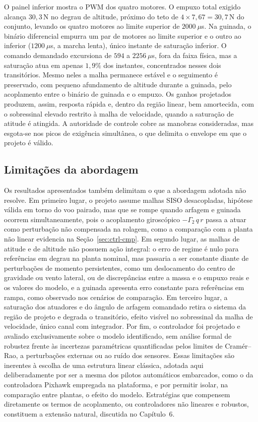 O painel inferior mostra o PWM dos quatro motores. O empuxo total exigido alcança {\color{blue}$30{,}3$\,N} no degrau de altitude, próximo do teto de {\color{blue}$4\times 7{,}67 = 30{,}7$}\,N do conjunto, levando os quatro motores ao limite superior de $2000\ \mu$s. Na guinada, o binário diferencial empurra um par de motores ao limite superior e o outro ao inferior ($1200\ \mu$s, a marcha lenta), único instante de saturação inferior. O comando demandado excursiona de $594$ a {\color{blue}$2256$}$\ \mu$s, fora da faixa física, mas a saturação atua em apenas $1{,}9\%$ dos instantes, concentrados nesses dois transitórios. Mesmo neles a malha permanece estável e o seguimento é preservado, com pequeno afundamento de altitude durante a guinada, pelo acoplamento entre o binário de guinada e o empuxo. Os ganhos projetados produzem, assim, resposta rápida e, dentro da região linear, bem amortecida, com o sobressinal elevado restrito à malha de velocidade, quando a saturação de atitude é atingida. A autoridade de controle cobre as manobras consideradas, mas esgota-se nos picos de exigência simultânea, o que delimita o envelope em que o projeto é válido.

\subsection{Limitações da abordagem}
\label{sec:limitacoes-pid}

Os resultados apresentados também delimitam o que a abordagem adotada não resolve. Em primeiro lugar, o projeto assume malhas SISO desacopladas, hipótese válida em torno do voo pairado, mas que se rompe quando arfagem e guinada ocorrem simultaneamente, pois o acoplamento giroscópico $-\Gamma_2\,q\,r$ passa a atuar como perturbação não compensada na rolagem, como a comparação com a planta não linear evidencia na Seção~\ref{sec:ctrl-cmp}. Em segundo lugar, as malhas de atitude e de altitude não possuem ação integral: o erro de regime é nulo para referências em degrau na planta nominal, mas passaria a ser constante diante de perturbações de momento persistentes, como um deslocamento do centro de gravidade ou vento lateral, ou de discrepâncias entre a massa e o empuxo reais e os valores do modelo, e a guinada apresenta erro constante para referências em rampa, como observado nos cenários de comparação. Em terceiro lugar, a saturação dos atuadores e do ângulo de arfagem comandado retira o sistema da região de projeto e degrada o transitório, efeito visível no sobressinal da malha de velocidade, único canal com integrador. Por fim, o controlador foi projetado e avaliado exclusivamente sobre o modelo identificado, sem análise formal de robustez frente às incertezas paramétricas quantificadas pelos limites de Cramér--Rao, a perturbações externas ou ao ruído dos sensores. Essas limitações são inerentes à escolha de uma estrutura linear clássica, adotada aqui deliberadamente por ser a mesma dos pilotos automáticos embarcados{\color{blue}, como o da controladora Pixhawk empregada na plataforma,} e por permitir isolar, na comparação entre plantas, o efeito do modelo. Estratégias que compensem diretamente os termos de acoplamento, ou controladores não lineares e robustos, constituem a extensão natural, discutida no Capítulo~6.
